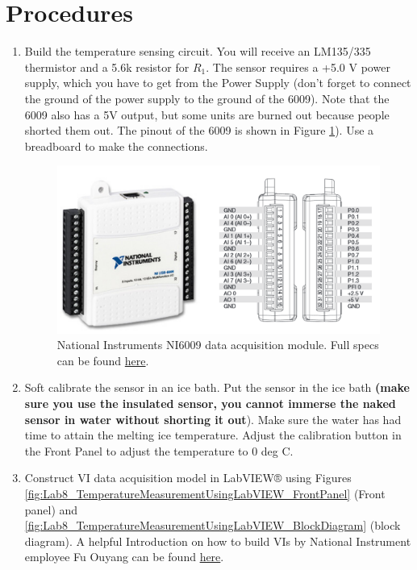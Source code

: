 \documentclass[11pt,letterpaper]{article}
\begin{document}
\section{Procedures}	 
\begin{enumerate}
\item Build the temperature sensing circuit. You will receive an LM135/335 thermistor and a 5.6k resistor for $R_1$.  The sensor requires a +5.0 V power supply, which you have to get from the Power Supply (don't forget to connect the ground of the power supply to the ground of the 6009). Note that the 6009 also has a 5V output, but some units are burned out because people shorted them out. The pinout of the 6009 is shown in Figure \ref{fig:Lab8_NationalInstrumentsUSB6009}). Use a breadboard to make the connections.

\begin{figure}
\centering
\includegraphics[width=1\linewidth]{Lab8_NationalInstrumentsUSB6009}
\caption{National Instruments NI6009 data acquisition module. Full specs can be found \href{http://abe-research.illinois.edu/Faculty/grift/ABE425_2015/Specs/USB6008.pdf}{here}.}
\label{fig:Lab8_NationalInstrumentsUSB6009}
\end{figure}

\item Soft calibrate the sensor in an ice bath. Put the sensor in the ice bath \textbf{(make sure you use the insulated sensor, you cannot immerse the naked sensor in water without shorting it out}). Make sure the water has had time to attain the melting ice temperature. Adjust the calibration button in the Front Panel to adjust the temperature to 0 deg C.
\item Construct VI data acquisition model in LabVIEW® using Figures \ref{fig:Lab8_TemperatureMeasurementUsingLabVIEW_FrontPanel} (Front panel) and \ref{fig:Lab8_TemperatureMeasurementUsingLabVIEW_BlockDiagram} (block diagram).
A helpful Introduction on how to build VIs by National Instrument employee Fu Ouyang can be found \href{http://abe-research.illinois.edu/Faculty/grift/ABE425_2016/Labs/Lab8_TemperatureMeasurementUsingLabView/Lab8_TemperatureMeasurementUsingLabView_InstructionOfBuildingVI_draft.pdf}{here}.\\ 


\end{enumerate}
\end{document}
